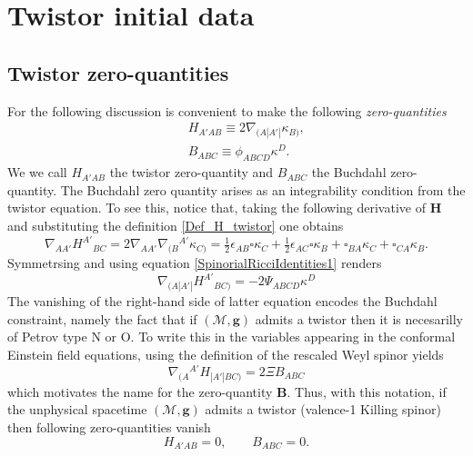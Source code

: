 \documentclass[10pt,a4paper]{article}
\theoremstyle{plain}
\def\bmg{{\bm g}}
\def\bmB{{\bm B}}
\def\bmH{{\bm H}}
\begin{document}
{\color{blue}
\section{Twistor initial data}

\subsection{Twistor zero-quantities}
\label{Sec:TwistorZeroQuantities}

For the following discussion is convenient to make the following
\emph{zero-quantities}
\begin{subequations}
  \begin{eqnarray}
   && H_{A'AB} \equiv 2
    \nabla_{(A|A'|}\kappa_{B)},\label{Def_H_twistor}\\ && B_{ABC}
    \equiv \phi_{ABCD}\kappa^D.\label{Def_B_twistor}
    \end{eqnarray}
\end{subequations}
   We we call $H_{A'AB}$ the twistor zero-quantity and
  $B_{ABC}$ the Buchdahl zero-quantity.  The Buchdahl zero quantity
  arises as an integrability condition from the twistor equation.  To
  see this, notice that, taking the following derivative of $\bmH$ and
  substituting the definition \eqref{Def_H_twistor} one obtains
  \begin{equation}\label{curl_H_twistor}
  \nabla_{AA'}H^{A'}{}_{BC}= 2 \nabla_{AA'}\nabla_{(B}{}^{A'}\kappa
  _{C)} = \tfrac{1}{2} \epsilon _{AB} \square \kappa _{C}  +
  \tfrac{1}{2}  \epsilon _{AC} \square \kappa _{B} +
  \square_{BA}\kappa _{C} + \square_{CA}\kappa _{B}.
  \end{equation}
  Symmetrsing and using equation \eqref{SpinorialRicciIdentities1} renders
  \[
  \nabla_{(A|A'|}H^{A'}{}_{BC)}= - 2\Psi_{ABCD}\kappa^D
  \]
  The vanishing of the right-hand side of latter equation encodes the
  Buchdahl constraint, namely the fact that if $(\mathcal{M},\bmg)$
  admits a twistor then it is necesarilly of Petrov type N or O. To write this in the variables appearing in the  conformal Einstein field equations, using the definition of the
  rescaled Weyl spinor yields
  \begin{equation}\label{Curl_H_sym_toB_twistor}
  \nabla_{(A}{}^{A'}H_{|A'|BC)} = 2\Xi B_{ABC} 
  \end{equation}
  which motivates the name for the zero-quantity $\bmB$.
  Thus, with this notation, if the unphysical spacetime
  $(\mathcal{M},\bmg)$ admits a twistor (valence-1 Killing spinor) then following
  zero-quantities vanish
  \begin{equation}
H_{A'AB}=0, \qquad B_{ABC}=0.
  \end{equation}
}
\end{document}
